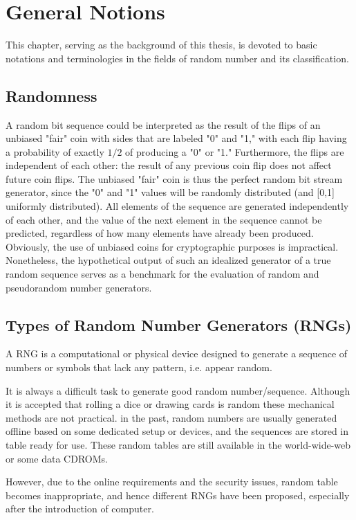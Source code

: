\chapter{General Notions}
\label{General Notions}
\minitoc
 
This chapter, serving as the background of this thesis,  is devoted to basic notations and terminologies in the fields of random number and its classification.


\section{Randomness}
A random bit sequence could be interpreted as the result of the flips of an unbiased "fair" coin with sides
that are labeled "0" and "1," with each flip having a probability of exactly $1/2$ of producing a "0" or "1."
Furthermore, the flips are independent of each other: the result of any previous coin flip does not affect
future coin flips. The unbiased "fair" coin is thus the perfect random bit stream generator, since the "0"
and "1" values will be randomly distributed (and [0,1] uniformly distributed). All elements of the
sequence are generated independently of each other, and the value of the next element in the sequence
cannot be predicted, regardless of how many elements have already been produced.
Obviously, the use of unbiased coins for cryptographic purposes is impractical. Nonetheless, the
hypothetical output of such an idealized generator of a true random sequence serves as a benchmark for
the evaluation of random and pseudorandom number generators.~\cite{ANDREW2008}

\section{Types of Random Number Generators (RNGs)}
A RNG is a computational or physical device designed to generate a sequence of numbers or symbols that lack any pattern, i.e. appear random.

It is always a difficult task to generate good random number/sequence. Although it is accepted that rolling a dice or drawing cards is random these mechanical methods are not practical. in the past, random numbers are usually generated offline based on some dedicated setup or devices, and the sequences are stored in table ready for use. These random tables are still available in the world-wide-web or some data CDROMs.

However, due to the online requirements and the security issues, random table becomes inappropriate, and hence different RNGs have been proposed, especially after the introduction of computer.

